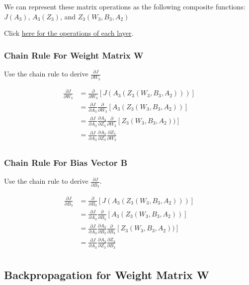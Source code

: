 \documentclass[11pt]{article}
\begin{document}
We can represent these matrix operations as the following composite
functions: \(J(A_3)\), \(A_3(Z_3)\), and \(Z_3(W_3, B_3, A_2)\)

Click
\hyperref[our-network-s-forward-propagation]{here for the operations of each layer}.

    \subsubsection{Chain Rule For Weight Matrix
W}\label{chain-rule-for-weight-matrix-w}

Use the chain rule to derive \(\frac{\partial J}{\partial W_3}\)

\begin{align*}
\frac{\partial J}{\partial W_3} &= \frac{\partial}{\partial W_3}[J(A_3(Z_3(W_3, B_3, A_2)))] \\
&= \frac{\partial J}{\partial A_3} \frac{\partial}{\partial W_3}[A_3(Z_3(W_3, B_3, A_2))] \\
&= \frac{\partial J}{\partial A_3} \frac{\partial A_3}{\partial Z_3} \frac{\partial}{\partial W_3}[Z_3(W_3, B_3, A_2))] \\
&= \frac{\partial J}{\partial A_3} \frac{\partial A_3}{\partial Z_3} \frac{\partial Z_3}{\partial W_3} \\
\end{align*}

    \subsubsection{Chain Rule For Bias Vector
B}\label{chain-rule-for-bias-vector-b}

Use the chain rule to derive \(\frac{\partial J}{\partial B_3}\).

\begin{align*}
\frac{\partial J}{\partial B_3} &= \frac{\partial}{\partial B_3}[J(A_3(Z_3(W_3, B_3, A_2)))] \\
&= \frac{\partial J}{\partial A_3} \frac{\partial}{\partial B_3}[A_3(Z_3(W_3, B_3, A_2))] \\
&= \frac{\partial J}{\partial A_3} \frac{\partial A_3}{\partial B_3} \frac{\partial}{\partial B_3}[Z_3(W_3, B_3, A_2))] \\
&= \frac{\partial J}{\partial A_3} \frac{\partial A_3}{\partial Z_3} \frac{\partial Z_3}{\partial B_3} \\
\end{align*}

    \subsection{Backpropagation for Weight Matrix
W}\label{backpropagation-for-weight-matrix-w}
\end{document}
